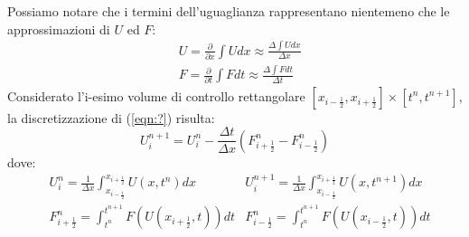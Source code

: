 \documentclass[12pt]{article} %
\begin{document}
Possiamo notare che i termini dell'uguaglianza rappresentano nientemeno che le approssimazioni di $U$ ed $F$:
\begin{equation}
    \begin{split}
    &U = \frac{\partial}{\partial x}\int U dx \approx \frac{\Delta\int U dx}{\Delta x} \\
    &F = \frac{\partial}{\partial t}\int F dt \approx \frac{\Delta\int F dt}{\Delta t}
    \end{split}
\end{equation}
\noindent Considerato l'i-esimo volume di controllo rettangolare $[x_{i-\frac{1}{2}},x_{i+\frac{1}{2}}] \times [t^n,t^{n+1}]$, la discretizzazione di (\ref{eqn:?}) risulta:
\begin{equation}
    U_i^{n+1}=U_i^{n}-\frac{\Delta t}{\Delta x}\left(F_{i+\frac{1}{2}}^n-F_{i-\frac{1}{2}}^n\right)
    \label{eqn:Riemann_discreto}
\end{equation}
\noindent dove:
\begin{align*}
    &U_i^{n}=\frac{1}{\Delta x}\int_{x_{i-\frac{1}{2}}}^{x_{i+\frac{1}{2}}}U\left(x,t^n\right)dx
    &U_i^{n+1}=\frac{1}{\Delta x}\int_{x_{i-\frac{1}{2}}}^{x_{i+\frac{1}{2}}}U\left(x,t^{n+1}\right)dx \\ &F_{i+\frac{1}{2}}^n=\int_{t^n}^{t^{n+1}}F\left(U\left(x_{i+\frac{1}{2}},t\right)\right)dt
    &F_{i-\frac{1}{2}}^n=\int_{t^n}^{t^{n+1}}F\left(U\left(x_{i-\frac{1}{2}},t\right)\right)dt
\end{align*}
\end{document}
